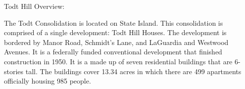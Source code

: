 Todt Hill Overview:       

     

The Todt Consolidation is located on State Island. This consolidation is comprised of a single development: Todt Hill Houses. The development is bordered by Manor Road, Schmidt's Lane, and LaGuardia and Westwood Avenues. It is a federally funded conventional development that finished construction in 1950. It is a made up of seven residential buildings that are 6- stories tall. The buildings cover 13.34 acres in which there are 499 apartments officially housing 985 people.   

 

 